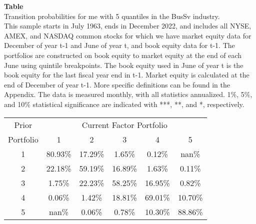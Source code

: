 \begin{table*}[ht!]
\raggedright
{}
\label{tab: transition_probs_me_BusSv_with_5_quantiles}
\textbf{Table \thetable} \\
Transition probabilities for me with 5 quantiles in the BusSv industry. \\
\hspace*{1em}This sample starts in July 1963, ends in December 2022, and includes all NYSE, AMEX, and NASDAQ common stocks for which we have market equity data for December of year t-1 and June of year t, and book equity data for t-1. The portfolios are constructed on book equity to market equity at the end of each June using quintile breakpoints.  The book equity used in June of year t is the book equity for the last fiscal year end in t-1.  Market equity is calculated at the end of December of year t-1.  More specific definitions can be found in the Appendix.  The data is measured monthly, with all statistics annualized.  1\%, 5\%, and 10\% statistical significance are indicated with ***, **, and *, respectively. \\
\vspace{0.5em}
\centering
\begin{adjustbox}{max width=\textwidth}
\begin{tabular}{@{}cccccc@{}}
\toprule
Prior & \multicolumn{5}{c}{Current Factor Portfolio} \\
Portfolio & 1 & 2 & 3 & 4 & 5 \\
\midrule
1 & 80.93\% & 17.29\% & 1.65\% & 0.12\% & nan\% \\
2 & 22.18\% & 59.19\% & 16.89\% & 1.63\% & 0.11\% \\
3 & 1.75\% & 22.23\% & 58.25\% & 16.95\% & 0.82\% \\
4 & 0.06\% & 1.42\% & 18.81\% & 69.01\% & 10.70\% \\
5 & nan\% & 0.06\% & 0.78\% & 10.30\% & 88.86\% \\
\bottomrule
\end{tabular}
\end{adjustbox}
\end{table*}
